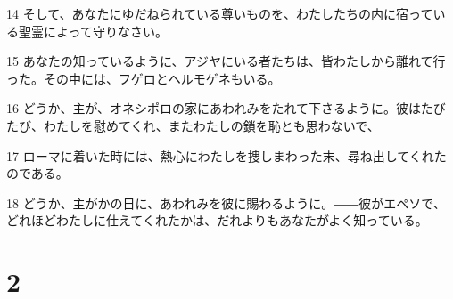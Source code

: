 \par 14 そして、あなたにゆだねられている尊いものを、わたしたちの内に宿っている聖霊によって守りなさい。
\par 15 あなたの知っているように、アジヤにいる者たちは、皆わたしから離れて行った。その中には、フゲロとヘルモゲネもいる。
\par 16 どうか、主が、オネシポロの家にあわれみをたれて下さるように。彼はたびたび、わたしを慰めてくれ、またわたしの鎖を恥とも思わないで、
\par 17 ローマに着いた時には、熱心にわたしを捜しまわった末、尋ね出してくれたのである。
\par 18 どうか、主がかの日に、あわれみを彼に賜わるように。――彼がエペソで、どれほどわたしに仕えてくれたかは、だれよりもあなたがよく知っている。

\chapter{2}

